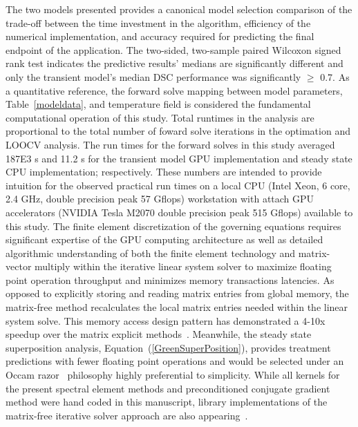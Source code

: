 \documentclass[12pt]{article}
\newcommand{\eqn}[1]{(\ref{#1})}
\begin{document}
The two models presented provides a canonical model selection comparison of the
trade-off between the time investment in the algorithm, efficiency of the
numerical implementation, and accuracy required for predicting the final endpoint
of the application. The two-sided, two-sample paired Wilcoxon signed rank test
indicates the predictive results' medians are significantly different and
only the transient model's median DSC performance was significantly
$\geq$ 0.7. 
{\color{red}
As a quantitative reference,
the forward solve mapping between model parameters, Table~\ref{modeldata}, 
and temperature field is considered the fundamental computational
operation of this study.
Total runtimes in the analysis are  proportional to the total number of foward solve
iterations in the optimation and LOOCV analysis. 
The run times for the forward solves in this study 
averaged 187E3 s and 11.2 s for the transient model GPU implementation 
and steady state CPU implementation; respectively. 
These numbers are intended to provide intuition for the observed
practical run times on a local CPU 
(Intel Xeon, 6 core, 2.4 GHz, double precision peak 57 Gflops)  
workstation with attach GPU accelerators
(NVIDIA Tesla M2070 double precision peak 515 Gflops) 
available to this study.
}
The finite element discretization of the governing equations requires significant
expertise of the GPU computing architecture as well as detailed algorithmic
understanding of both the finite element technology and matrix-vector multiply
within the iterative linear system solver to maximize floating point operation
throughput and minimizes memory transactions latencies.
As opposed to explicitly storing and reading matrix entries
from global memory, the matrix-free method recalculates the local matrix entries
needed within the linear system solve.
This memory access design pattern has demonstrated a 4-10x speedup  over
the matrix explicit methods~\cite{Muller2013,Knepley_2_2013,Medina2014}.
Meanwhile, the steady state superposition analysis, Equation~\eqn{GreenSuperPosition},
provides treatment predictions with fewer floating point operations and would be selected under an Occam
razor~\cite{jaynes2003probability} philosophy highly preferential to simplicity.
While all kernels
for the present spectral element methods and preconditioned conjugate gradient
method were hand coded in this manuscript, library implementations of the
matrix-free iterative solver approach are also
appearing~\cite{Knepley2013,Knepley2014}. 
\end{document}
